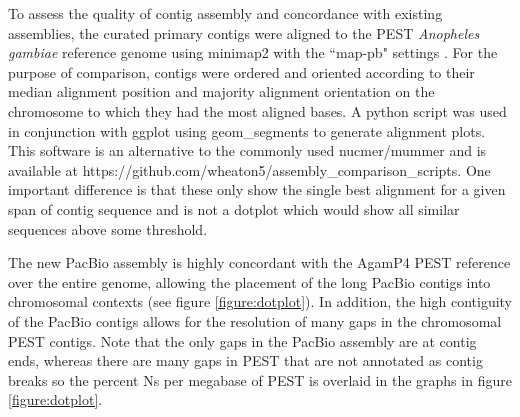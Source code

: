 \par{
To assess the quality of contig assembly and concordance with existing assemblies, the curated primary contigs were aligned to the PEST \textit{Anopheles gambiae} reference genome \cite{PEST}\cite{PEST2} using minimap2 with the ``map-pb" settings \cite{minimap2}. For the purpose of comparison, contigs were ordered and oriented according to their median alignment position and majority alignment orientation on the chromosome to which they had the most aligned bases. A python script was used in conjunction with ggplot using geom\_segments to generate alignment plots. This software is an alternative to the commonly used nucmer/mummer \cite{mummer} and is available at https://github.com/wheaton5/assembly\_comparison\_scripts. One important difference is that these only show the single best alignment for a given span of contig sequence and is not a dotplot which would show all similar sequences above some threshold.
}

\par{
The new PacBio assembly is highly concordant with the AgamP4 PEST reference over the entire genome, allowing the placement of the long PacBio contigs into chromosomal contexts (see figure \ref{figure:dotplot}). In addition, the high contiguity of the PacBio contigs allows for the resolution of many gaps in the chromosomal PEST contigs. Note that the only gaps in the PacBio assembly are at contig ends, whereas there are many gaps in PEST that are not annotated as contig breaks so the percent Ns per megabase of PEST is overlaid in the graphs in figure \ref{figure:dotplot}. 
}

